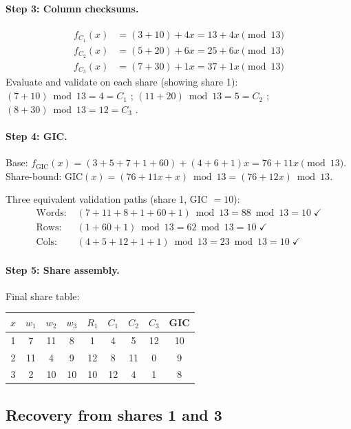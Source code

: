 \documentclass[11pt]{article}
\begin{document}
\paragraph{Step 3: Column checksums.}
\begin{align*}
f_{C_1}(x) &= (3{+}10) + 4x = 13 + 4x \pmod{13} \\
f_{C_2}(x) &= (5{+}20) + 6x = 25 + 6x \pmod{13} \\
f_{C_3}(x) &= (7{+}30) + 1x = 37 + 1x \pmod{13}
\end{align*}
Evaluate and validate on each share (showing share 1):
$(7{+}10) \bmod 13 = 4 = C_1$ \checkmark;\;
$(11{+}20) \bmod 13 = 5 = C_2$ \checkmark;\;
$(8{+}30) \bmod 13 = 12 = C_3$ \checkmark.

\paragraph{Step 4: GIC.}
Base: $f_\text{GIC}(x) = (3{+}5{+}7{+}1{+}60) + (4{+}6{+}1)x = 76 + 11x \pmod{13}$.
Share-bound: $\text{GIC}(x) = (76 + 11x + x) \bmod 13 = (76 + 12x) \bmod 13$.

Three equivalent validation paths (share 1, GIC $= 10$):
\begin{align*}
\text{Words:}\; &(7{+}11{+}8{+}1{+}60{+}1) \bmod 13 = 88 \bmod 13 = 10 \;\checkmark \\
\text{Rows:}\; &(1{+}60{+}1) \bmod 13 = 62 \bmod 13 = 10 \;\checkmark \\
\text{Cols:}\; &(4{+}5{+}12{+}1{+}1) \bmod 13 = 23 \bmod 13 = 10 \;\checkmark
\end{align*}

\paragraph{Step 5: Share assembly.} Final share table:
\begin{center}
\small
\begin{tabular}{@{}ccccccccc@{}}
\toprule
$x$ & $w_1$ & $w_2$ & $w_3$ & $R_1$ & $C_1$ & $C_2$ & $C_3$ & GIC \\ \midrule
1 & 7 & 11 & 8 & 1 & 4 & 5 & 12 & 10 \\
2 & 11 & 4 & 9 & 12 & 8 & 11 & 0 & 9 \\
3 & 2 & 10 & 10 & 10 & 12 & 4 & 1 & 8 \\
\bottomrule
\end{tabular}
\end{center}

\subsection{Recovery from shares 1 and 3}
\end{document}

